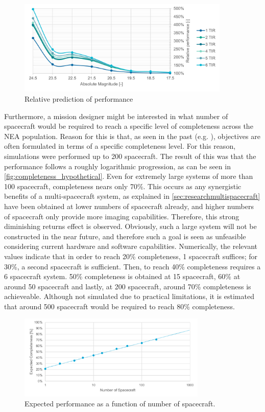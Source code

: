 \begin{figure}[htbp]
 \centering
 \includegraphics[width=0.9\textwidth]{img/performance_prediction_rel.pdf}
 \caption{Relative prediction of performance}
 \label{fig:performance_prediction_rel}
\end{figure}

Furthermore, a mission designer might be interested in what number of spacecraft would be required to reach a specific level of completeness across the NEA population. Reason for this is that, as seen in the past (e.g. \cite{2003NEOSDT}), objectives are often formulated in terms of a specific completeness level. For this reason, simulations were performed up to 200 spacecraft. The result of this was that the performance follows a roughly logarithmic progression, as can be seen in \autoref{fig:completeness_hypothetical}. Even for extremely large systems of more than 100 spacecraft, completeness nears only 70\%. This occurs as any synergistic benefits of a multi-spacecraft system, as explained in \autoref{sec:researchmultispacecraft} have been obtained at lower numbers of spacecraft already, and higher numbers of spacecraft only provide more imaging capabilities. Therefore, this strong diminishing returns effect is observed. Obviously, such a large system will not be constructed in the near future, and therefore such a goal is seen as unfeasible considering current hardware and software capabilities. Numerically, the relevant values indicate that in order to reach 20\% completeness, 1 spacecraft suffices; for 30\%, a second spacecraft is sufficient. Then, to reach 40\% completeness requires a 6 spacecraft system. 50\% completeness is obtained at 15 spacecraft, 60\% at around 50 spacecraft and lastly, at 200 spacecraft, around 70\% completeness is achieveable. Although not simulated due to practical limitations, it is estimated that around 500 spacecraft would be required to reach 80\% completeness.

\begin{figure}[htbp]
 \centering
 \includegraphics[width=0.8\textwidth]{img/completeness_hypothetical.pdf}
 \caption{Expected performance as a function of number of spacecraft.}
 \label{fig:completeness_hypothetical}
\end{figure}

